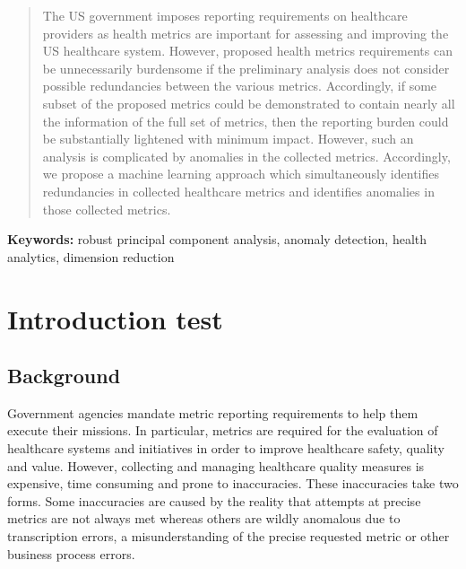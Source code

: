 \documentclass[conference]{IEEEtran}
\begin{document}
\begin{abstract}


The US government imposes reporting requirements on healthcare providers as health metrics are important for assessing and improving the US healthcare system.  However, proposed health metrics requirements can be unnecessarily burdensome if the preliminary analysis does not consider possible redundancies between the various metrics.  Accordingly, if some subset of the proposed metrics could be demonstrated to contain nearly all the information of  the full set of metrics,
then the reporting burden could be substantially  lightened with minimum impact.  However, such an analysis is complicated by anomalies in the collected metrics.  Accordingly, we propose a machine learning approach which simultaneously identifies redundancies in collected healthcare metrics and identifies anomalies in those collected metrics.
\end{abstract}

{\bf Keywords:} robust principal component analysis, anomaly
detection, health analytics, dimension reduction

\section{Introduction test}

\subsection{Background}
Government agencies  mandate  metric reporting requirements to help them execute their missions.  In particular,  metrics are required for the evaluation of healthcare systems and initiatives in order to improve healthcare safety, quality and value. However, collecting and managing healthcare quality measures is expensive,  time consuming and prone to inaccuracies.  These inaccuracies take two forms.  Some inaccuracies are caused by the reality that attempts at precise metrics are not always met whereas others are wildly anomalous due to transcription errors, a misunderstanding of the precise requested metric or other business process errors.
\end{document}
